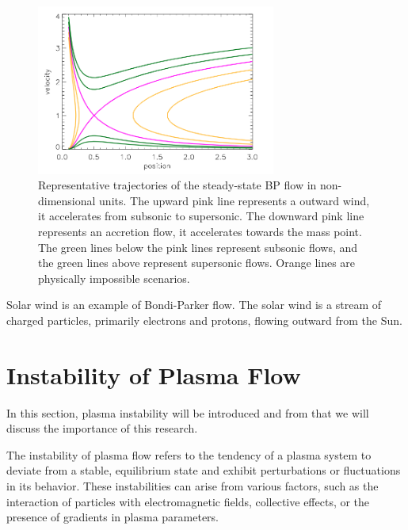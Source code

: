 \begin{figure}[htbp]
    \centering
    \includegraphics[width=0.7\textwidth]{../../thesis/img/introduction/steady-state-BP-flow}
    \caption{Representative trajectories of the steady-state BP flow in non-dimensional units. \cite{keto_stability_2020} The upward pink line represents a outward wind, it accelerates from subsonic to supersonic. The downward pink line represents an accretion flow, it accelerates towards the mass point. The green lines below the pink lines represent subsonic flows, and the green lines above represent supersonic flows. Orange lines are physically impossible scenarios.}
    \label{fig:BP-flow-velocity}
\end{figure}

Solar wind is an example of Bondi-Parker flow. The solar wind is a stream of charged particles, primarily electrons and protons, flowing outward from the Sun. 

\section{Instability of Plasma Flow}
In this section, plasma instability will be introduced and from that we will discuss the importance of this research.

The instability of plasma flow refers to the tendency of a plasma system to deviate from a stable, equilibrium state and exhibit perturbations or fluctuations in its behavior. These instabilities can arise from various factors, such as the interaction of particles with electromagnetic fields, collective effects, or the presence of gradients in plasma parameters.

